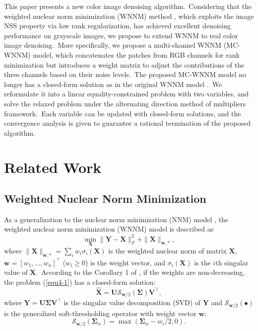 This paper presents a new color image denoising algorithm.\ Considering that the weighted nuclear norm minimization (WNNM) method \cite{wnnm,wnnmijcv}, which exploits the image NSS property via low rank regularization, has achieved excellent denoising performance on grayscale images, we propose to extend WNNM to real color image denoising.\ More specifically, we propose a multi-channel WNNM (MC-WNNM) model, which concatenates the patches from RGB channels for rank minimization but introduces a weight matrix to adjust the contributions of the three channels based on their noise levels.\ The proposed MC-WNNM model no longer has a closed-form solution as in the original WNNM model \cite{wnnmijcv}.\ We reformulate it into a linear equality-constrained problem with two variables, and solve the relaxed problem under the alternating direction method of multipliers \cite{admm} framework.\ Each variable can be updated with closed-form solutions, and the convergence analysis is given to guarantee a rational termination of the proposed algorithm.

\section{Related Work}

\subsection{Weighted Nuclear Norm Minimization}

As a generalization to the nuclear norm minimization (NNM) model \cite{cai2010singular}, the weighted nuclear norm minimization (WNNM) model \cite{wnnm,wnnmijcv} is described as 
\begin{equation}
\label{equ4-1}
\min_{\mathbf{X}}\|\mathbf{Y}-\mathbf{X}\|_{F}^{2}
+
\|\mathbf{X}\|_{\bm{w},*},
\end{equation}
where $\|\mathbf{X}\|_{\bm{w},*}=\sum_{i}w_{i}\sigma_{i}(\mathbf{X})$ is the weighted nuclear norm of matrix $\mathbf{X}$, $\bm{w}=[w_{1},...,w_{n}]^{\top}$ ($w_{i}\ge 0$) is the weight vector, and $\sigma_{i}(\mathbf{X})$ is the $i$th singular value of $\mathbf{X}$.\ According to the Corollary 1 of \cite{wnnmijcv}, if the weights are non-decreasing, the problem (\ref{equ4-1}) has a closed-form solution: 
\begin{equation}
\label{equ4-2}
\mathbf{\hat{X}}
=
\mathbf{U}
\mathcal{S}_{\bm{w}/2}
(\mathbf{\Sigma})
\mathbf{V}^{\top},
\end{equation}
where $\mathbf{Y}=\mathbf{U}\mathbf{\Sigma}\mathbf{V}^{\top}$ is the singular value decomposition (SVD) \cite{eckart1936approximation} of $\mathbf{Y}$ and 
$\mathcal{S}_{\bm{w}/2}(\bullet)$ is the generalized soft-thresholding operator with weight vector $\bm{w}$:
\begin{equation}
\label{equ4-3}
\mathcal{S}_{\bm{w}/2}
(\mathbf{\Sigma}_{ii})
=
\max(\mathbf{\Sigma}_{ii}-w_{i}/2, 0).
\end{equation}

